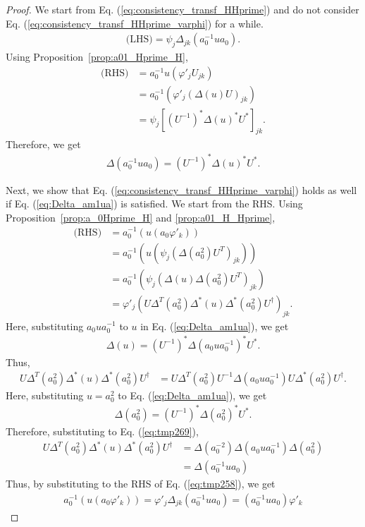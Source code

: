 \documentclass{article}
\theoremstyle{definition}
\begin{document}
\begin{proof}
  We start from Eq. (\ref{eq:consistency_transf_HHprime}) and do not consider Eq. (\ref{eq:consistency_transf_HHprime_varphi}) for a while.
  \begin{align}
    \text{(LHS)} = \psi_j \Delta_{jk}(a_0^{-1} u a_0).
  \end{align}
  Using Proposition~\ref{prop:a01_Hprime_H},
  \begin{align}
    \text{(RHS)} &= 
    a_0^{-1} u (\varphi'_j U_{jk}) 
    \nonumber
    \\&
    = a_0^{-1} (\varphi'_j (\Delta(u)U)_{jk})
    \nonumber
    \\&=
    \psi_j [(U^{-1})^* \Delta(u)^* U^*]_{jk}.
  \end{align}
  Therefore, we get
  \begin{align}
    \Delta(a_0^{-1} u a_0) = (U^{-1})^* \Delta(u)^* U^*.
  \end{align}

  Next, we show that Eq. (\ref{eq:consistency_transf_HHprime_varphi}) holds as well if Eq. (\ref{eq:Delta_am1ua}) is satisfied. We start from the RHS. Using Proposition~\ref{prop:a_0Hprime_H} and \ref{prop:a01_H_Hprime},
  \begin{align}
    \text{(RHS)}
    &=
    a_0^{-1}(u (a_0 \varphi'_k))
    \nonumber
    \\&=
    a_0^{-1} (u( \psi_j (\Delta (a_0^2) U^{T})_{jk}))
    \nonumber
    \\&=
    a_0^{-1} ( \psi_j (\Delta(u) \Delta (a_0^2) U^{T})_{jk})
    \nonumber
    \\&=
    \varphi'_j (U \Delta^T(a_0^{2}) \Delta^*(u) \Delta^*(a_0^2) U^{\dag})_{jk}.
    \label{eq:tmp258}
  \end{align}
  Here, substituting $a_0 u a_0^{-1}$ to $u$ in Eq. (\ref{eq:Delta_am1ua}), we get
  \begin{align}
    \Delta(u) = (U^{-1})^* \Delta(a_0 u a_0^{-1})^* U^*.
  \end{align}
  Thus, 
  \begin{align}
    U \Delta^T(a_0^{2}) \Delta^*(u) \Delta^*(a_0^2) U^{\dag}
    &=
    U \Delta^T(a_0^{2}) U^{-1} \Delta(a_0 u a_0^{-1}) U \Delta^*(a_0^2) U^{\dag}.
    \label{eq:tmp269}
  \end{align}
  Here, substituting $u=a_0^2$ to Eq. (\ref{eq:Delta_am1ua}), we get
  \begin{align}
    \Delta(a_0^2) = (U^{-1})^* \Delta(a_0^2)^* U^*.
  \end{align}
  Therefore, substituting to Eq. (\ref{eq:tmp269}),
  \begin{align}
    U \Delta^T(a_0^{2}) \Delta^*(u) \Delta^*(a_0^2) U^{\dag} 
    &= 
    \Delta(a_0^{-2}) \Delta(a_0 u a_0^{-1}) \Delta(a_0^{2})
    \nonumber
    \\&=
    \Delta(a_0^{-1} u a_0)
  \end{align}
  Thus, by substituting to the RHS of Eq. (\ref{eq:tmp258}),
  we get
  \begin{align}
    a_0^{-1}(u (a_0 \varphi'_k)) 
    = \varphi'_j \Delta_{jk}(a_0^{-1} u a_0) 
    = (a_0^{-1} u a_0) \varphi'_k
  \end{align}
\end{proof}
\end{document}
